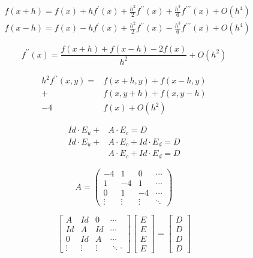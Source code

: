 \begin{refsection}
	[FDM]
	\begin{align}
		 & f(x+h) = f(x)+hf^{\prime}(x)
		+\frac{h^2}{2}f^{\prime\prime}(x)+\frac{h^3}{6}f^{\prime\prime\prime}(x) + O(h^{4}) \\
		 & f(x-h) = f(x)-hf^{\prime}(x)
		+\frac{h^2}{2}f^{\prime\prime}(x)-\frac{h^3}{6}f^{\prime\prime\prime}(x) + O(h^{4})
	\end{align}

	\begin{equation}
		f^{\prime\prime}(x) = \frac{f(x+h) + f(x-h) - 2f(x)}{h^{2}} + O(h^{2})
	\end{equation}

	\begin{equation}
		\begin{split}
			h^{2}f^{\prime\prime}(x,y)=&f(x+h,y) + f(x-h,y) \\
			+ &f(x,y+h) + f(x,y-h) \\
			- 4&f(x)+ O(h^{2})
		\end{split}
	\end{equation}

	\begin{align}
		Id \cdot E_{u} + & A \cdot E_{c} = D                  \\
		Id \cdot E_{u} + & A \cdot E_{c} + Id \cdot E_{d} = D \\
		                 & A \cdot E_{c} + Id \cdot E_{d} = D
	\end{align}

	\begin{equation}
		A =
		\begin{pmatrix}
			-4      & 1      & 0      & \cdots \\
			1      & -4      & 1      & \cdots \\
			0      & 1      & -4      & \cdots \\
			\vdots & \vdots & \vdots & \ddots
		\end{pmatrix}
	\end{equation}

	\begin{equation}
		\begin{bmatrix}
			A      & Id     & 0      & \cdots \\
			Id     & A      & Id     & \cdots \\
			0      & Id     & A      & \cdots \\
			\vdots & \vdots & \vdots & \ddots
			\cdot
		\end{bmatrix}
		\begin{bmatrix}
			E \\
			E \\
			E \\
			E
		\end{bmatrix}
		=
		\begin{bmatrix}
			D \\
			D \\
			D \\
			D
		\end{bmatrix}
	\end{equation}


\end{refsection}
